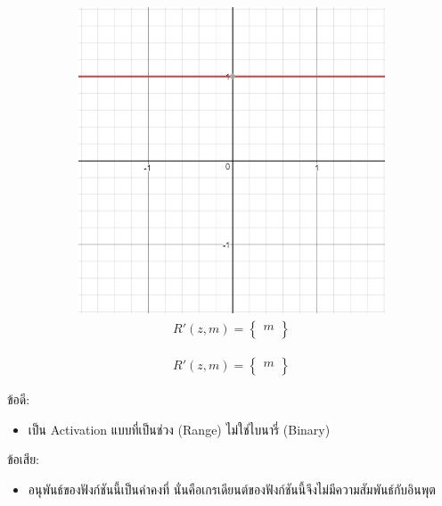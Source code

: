 \begin{itemize}
\begin{figure}[H]
\begin{subfigure}{0.5\textwidth}
            \centering
            \includegraphics[width=0.9\linewidth]{fig/actfunc_linear_der.png}
            \caption{%
                \begin{equation}
                    \begin{split}R'(z,m) = \begin{Bmatrix} m \\
                    \end{Bmatrix}\end{split}
                \end{equation}
            }
            \label{fig:actfunc_lin_der}
        \end{subfigure}
    \end{figure}
    ข้อดี:
    \begin{itemize}
        \item เป็น Activation แบบที่เป็นช่วง (Range) ไม่ใช่ไบนารี่ (Binary)
    \end{itemize}
    ข้อเสีย:
    \begin{itemize}
        \item อนุพันธ์ของฟังก์ชันนี้เป็นค่าคงที่ นั่นคือเกรเดียนต์ของฟังก์ชันนี้จึงไม่มีความสัมพันธ์กับอินพุต
    \end{itemize}


\end{itemize}
